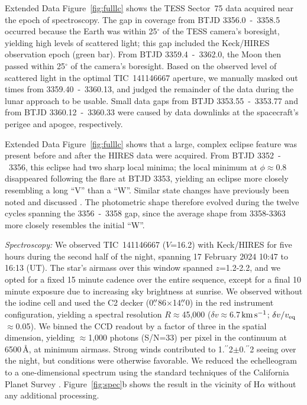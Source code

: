 \documentclass{nature3}
\newcommand{\farcs}{\mbox{\ensuremath{.\!\!^{\prime\prime}}}}%
\newcommand{\kms}{\ensuremath{\rm km\,s^{-1}}}
\begin{document}
\begin{methods}
Extended Data Figure~\ref{fig:fulllc} shows the TESS Sector~75 data acquired near
the epoch of spectroscopy.  The gap in coverage from BTJD
3356.0~-~3358.5 occurred because the Earth was within 25$^\circ$ of
the TESS camera's boresight, yielding high levels of scattered light;
this gap included the Keck/HIRES observation epoch (green bar).  From
BTJD 3359.4~-~3362.0, the Moon then passed within 25$^\circ$ of the
camera's boresight.  Based on the observed level of scattered light in
the optimal TIC~141146667 aperture, we manually masked out times from
3359.40~-~3360.13, and judged the remainder of the data during the
lunar approach to be usable.  Small data gaps from BTJD
3353.55~-~3353.77 and from BTJD 3360.12~-~3360.33 were caused by data
downlinks at the spacecraft's perigee and apogee, respectively.

Extended Data Figure~\ref{fig:fulllc} shows that a large, complex eclipse
feature was present before and after the HIRES data were
acquired.  From BTJD 3352~-~3356, this eclipse had two sharp local
minima;  the local minimum at $\phi$$\approx$0.8 disappeared following
the flare at BTJD 3353, yielding an eclipse more closely resembling a
long ``V'' than a ``W''.  Similar state changes have previously been
noted and discussed \cite{Stauffer2017,Bouma2024}.  The photometric
shape therefore evolved during the twelve cycles spanning the
3356~-~3358 gap, since the average shape from 3358-3363 more
closely resembles the initial ``W''.



{\it Spectroscopy:}
We observed TIC~141146667 ($V$=16.2) with Keck/HIRES for five hours
during the second half of the night, spanning 17 February 2024 10:47
to 16:13 (UT).
The star's airmass over this window spanned $z$=1.2-2.2, and we opted
for a fixed 15 minute cadence over the entire sequence, except for a
final 10 minute exposure due to increasing sky brightness at sunrise.
We observed without the iodine cell and used the C2 decker
(0$\farcs$86$\times$14$\farcs$0) in the red instrument configuration,
yielding a spectral resolution $R$$\approx$45{,}000 ($\delta
v$$\approx$6.7\,\kms; $\delta v / v_{\rm eq}$$\approx$0.05).  We binned
the CCD readout by a factor of three in the spatial dimension, yielding
$\approx$1,000 photons (S/N=33) per pixel in the continuum at 6500\,\AA,
at minimum airmass.  Strong winds contributed to 1\farcs2$\pm$0\farcs2
seeing over the night, but conditions were otherwise favorable.  We
reduced the echelleogram to a one-dimensional spectrum using the
standard techniques of the California Planet Survey \cite{Howard2010}.
Figure~\ref{fig:spec}b shows the result in the vicinity of H$\alpha$
without any additional processing.



\end{methods}
\end{document}
